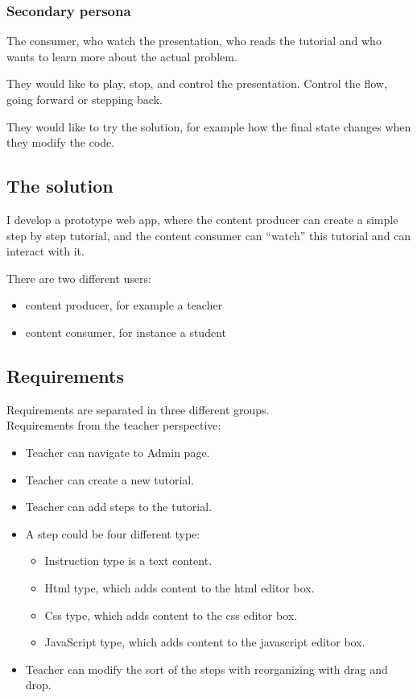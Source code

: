 \subsubsection{Secondary persona}\label{secondary-persona}

The consumer, who watch the presentation, who reads the tutorial and who
wants to learn more about the actual problem.

They would like to play, stop, and control the presentation. Control the
flow, going forward or stepping back.

They would like to try the solution, for example how the final state
changes when they modify the code.

\subsection{The solution}\label{the-solution}

I develop a prototype web app, where the content producer can create a
simple step by step tutorial, and the content consumer can ``watch''
this tutorial and can interact with it.

There are two different users:

\begin{itemize}
\item
  content producer, for example a teacher
\item
  content consumer, for instance a student
\end{itemize}

\subsection{Requirements}\label{requirements}

Requirements are separated in three different groups.\\
Requirements from the teacher perspective:

\begin{itemize}
\item
  Teacher can navigate to Admin page.
\item
  Teacher can create a new tutorial.
\item
  Teacher can add steps to the tutorial.
\item
  A step could be four different type:

  \begin{itemize}
  \item
    Instruction type is a text content.
  \item
    Html type, which adds content to the html editor box.
  \item
    Css type, which adds content to the css editor box.
  \item
    JavaScript type, which adds content to the javascript editor box.
  \end{itemize}
\item
  Teacher can modify the sort of the steps with reorganizing with drag
  and drop.
\end{itemize}

